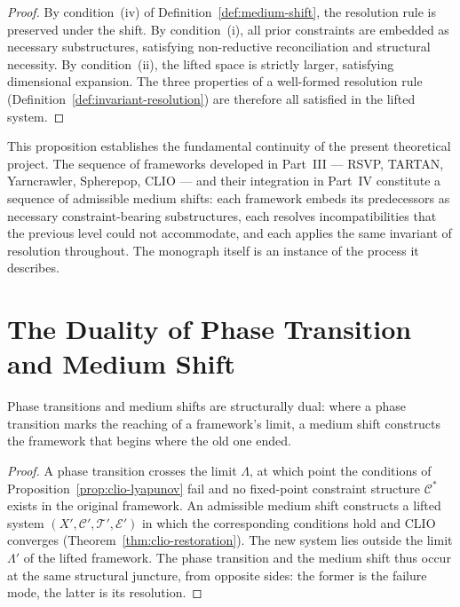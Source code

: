 \documentclass[11pt,openany]{book}
\begin{document}
\begin{proof}
By condition~(iv) of Definition~\ref{def:medium-shift},
the resolution rule is preserved under the shift.  By
condition~(i), all prior constraints are embedded as
necessary substructures, satisfying non-reductive
reconciliation and structural necessity.  By condition~(ii),
the lifted space is strictly larger, satisfying dimensional
expansion.  The three properties of a well-formed
resolution rule (Definition~\ref{def:invariant-resolution})
are therefore all satisfied in the lifted system.
\end{proof}

This proposition establishes the fundamental continuity
of the present theoretical project.  The sequence of
frameworks developed in Part~III --- RSVP, TARTAN,
Yarncrawler, Spherepop, CLIO --- and their integration in
Part~IV constitute a sequence of admissible medium shifts:
each framework embeds its predecessors as necessary
constraint-bearing substructures, each resolves
incompatibilities that the previous level could not
accommodate, and each applies the same invariant of
resolution throughout.  The monograph itself is an instance
of the process it describes.

\section{The Duality of Phase Transition and Medium Shift}
\label{sec:duality}

\begin{proposition}
\label{prop:duality}
Phase transitions and medium shifts are structurally dual:
where a phase transition marks the reaching of a
framework's limit, a medium shift constructs the framework
that begins where the old one ended.
\end{proposition}

\begin{proof}
A phase transition crosses the limit $\Lambda$, at which
point the conditions of Proposition~\ref{prop:clio-lyapunov}
fail and no fixed-point constraint structure $\mathcal{C}^*$
exists in the original framework.  An admissible medium
shift constructs a lifted system $(X', \mathcal{C}',
\mathcal{T}', \mathcal{E}')$ in which the corresponding
conditions hold and CLIO converges
(Theorem~\ref{thm:clio-restoration}).  The new system lies
outside the limit $\Lambda'$ of the lifted framework.  The
phase transition and the medium shift thus occur at the
same structural juncture, from opposite sides: the former
is the failure mode, the latter is its resolution.
\end{proof}
\end{document}
